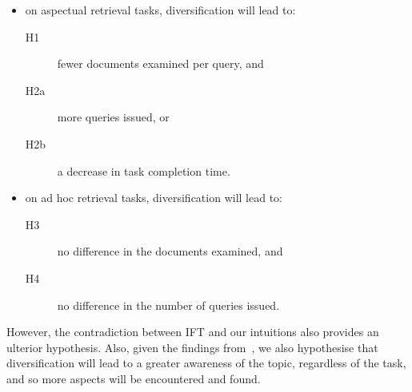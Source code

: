 \begin{itemize}
\item on aspectual retrieval tasks, diversification will lead to:
\begin{description}
\item [H1] fewer documents examined per query, and
\item [H2a] more queries issued, or
\item [H2b] a decrease in task completion time.
\end{description}

\item on ad hoc retrieval tasks, diversification will lead to:
\begin{description}
\item [H3] no difference in the documents examined, and
\item [H4] no difference in the number of queries issued.
\end{description}
\end{itemize}

However, the contradiction between IFT and our intuitions also provides an ulterior hypothesis. Also, given the findings from~\cite{syed2017sal}, we also hypothesise that diversification will lead to a greater awareness of the topic, regardless of the task, and so more aspects will be encountered and found.






